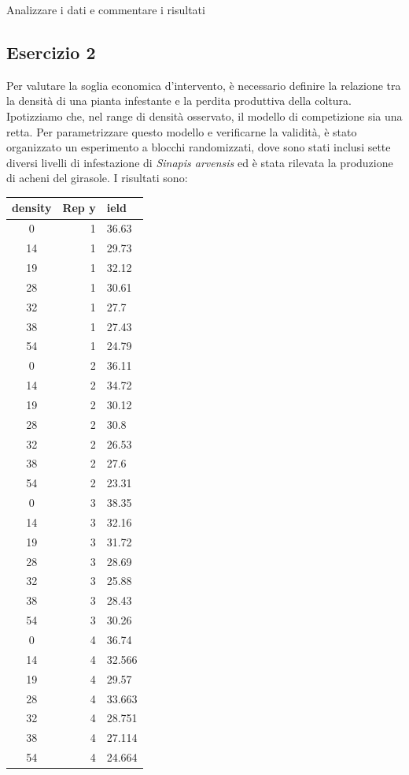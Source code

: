 \documentclass[a4paper,12pt,oneside]{book}
\begin{document}
Analizzare i dati e commentare i risultati

\hypertarget{esercizio-2-6}{%
\subsection{Esercizio 2}\label{esercizio-2-6}}

Per valutare la soglia economica d'intervento, è necessario definire la relazione tra la densità di una pianta infestante e la perdita produttiva della coltura. Ipotizziamo che, nel range di densità osservato, il modello di competizione sia una retta. Per parametrizzare questo modello e verificarne la validità, è stato organizzato un esperimento a blocchi randomizzati, dove sono stati inclusi sette diversi livelli di infestazione di \emph{Sinapis arvensis} ed è stata rilevata la produzione di acheni del girasole. I risultati sono:

\begin{longtable}[]{@{}crl@{}}
\toprule
density & Rep y & ield \\
\midrule
\endhead
0 & 1 & 36.63 \\
14 & 1 & 29.73 \\
19 & 1 & 32.12 \\
28 & 1 & 30.61 \\
32 & 1 & 27.7 \\
38 & 1 & 27.43 \\
54 & 1 & 24.79 \\
0 & 2 & 36.11 \\
14 & 2 & 34.72 \\
19 & 2 & 30.12 \\
28 & 2 & 30.8 \\
32 & 2 & 26.53 \\
38 & 2 & 27.6 \\
54 & 2 & 23.31 \\
0 & 3 & 38.35 \\
14 & 3 & 32.16 \\
19 & 3 & 31.72 \\
28 & 3 & 28.69 \\
32 & 3 & 25.88 \\
38 & 3 & 28.43 \\
54 & 3 & 30.26 \\
0 & 4 & 36.74 \\
14 & 4 & 32.566 \\
19 & 4 & 29.57 \\
28 & 4 & 33.663 \\
32 & 4 & 28.751 \\
38 & 4 & 27.114 \\
54 & 4 & 24.664 \\
\bottomrule
\end{longtable}
\end{document}
